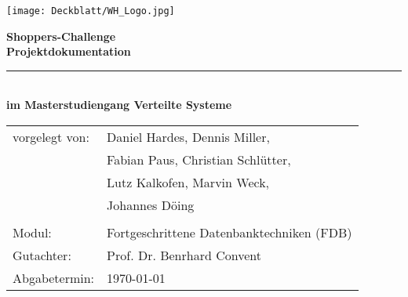 \thispagestyle{plain}
\begin{titlepage}

\begin{center}

\texttt{[image: Deckblatt/WH\_Logo.jpg]}

\vspace{2cm}

\Huge{\textbf{Shoppers-Challenge}}\\[1.5ex]
\Large{\textbf{Projektdokumentation}}
\rule{\textwidth}{0.4pt}\\[3.0ex]

\large{\textbf{im Masterstudiengang Verteilte Systeme}}\\[3.0ex]

\normalsize
\begin{tabular}{ll}\\
	vorgelegt von: 
	& \quad Daniel Hardes, Dennis Miller, \\[1.2ex]
	& \quad Fabian Paus, Christian Schlütter,\\[1.2ex]
	& \quad Lutz Kalkofen, Marvin Weck, \\[1.2ex]
	& \quad Johannes Döing\\[1.2ex]
	& \quad \\[1.2ex]
	Modul:  & \quad Fortgeschrittene Datenbanktechniken (FDB) \\[1.2ex]
	Gutachter:  & \quad Prof. Dr. Benrhard Convent \\[1.2ex]
	Abgabetermin:  & \quad \today\\[1.2ex]
\end{tabular}

\end{center}

\end{titlepage}
